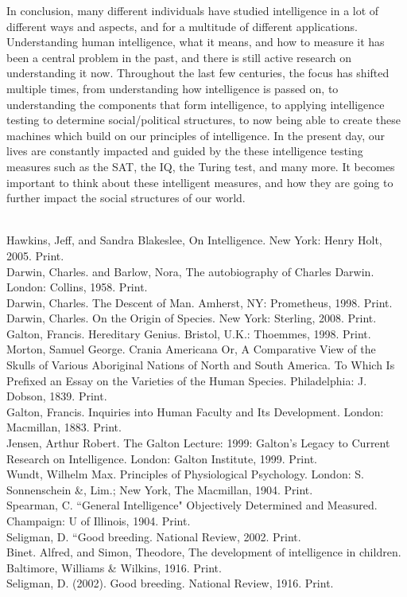 \documentclass[12pt, oneside]{article}
\begin{document}
\par In conclusion, many different individuals have studied intelligence in a lot of different ways and aspects, and for a multitude of different applications. Understanding human intelligence, what it means, and how to measure it has been a central problem in the past, and there is still active research on understanding it now. Throughout the last few centuries, the focus has shifted multiple times, from understanding how intelligence is passed on, to understanding the components that form intelligence, to applying intelligence testing to determine social/political structures, to now being able to create these machines which build on our principles of intelligence. In the present day, our lives are constantly impacted and guided by the these intelligence testing measures such as the SAT, the IQ, the Turing test, and many more. It becomes important to think about these intelligent measures, and how they are going to further impact the social structures of our world.

\noindent

\begin{workscited}
\bibent \\
\bibent Hawkins, Jeff, and Sandra Blakeslee, On Intelligence. New York: Henry Holt, 2005. Print. \\
\bibent Darwin, Charles. and Barlow, Nora, The autobiography of Charles Darwin. London: Collins, 1958. Print. \\
\bibent Darwin, Charles. The Descent of Man. Amherst, NY: Prometheus, 1998. Print. \\
\bibent Darwin, Charles. On the Origin of Species. New York: Sterling, 2008. Print. \\
\bibent Galton, Francis. Hereditary Genius. Bristol, U.K.: Thoemmes, 1998. Print. \\
\bibent Morton, Samuel George. Crania Americana Or, A Comparative View of the Skulls of Various Aboriginal Nations of North and South America. To Which Is Prefixed an Essay on the Varieties of the Human Species. Philadelphia: J. Dobson, 1839. Print.\\
\bibent Galton, Francis. Inquiries into Human Faculty and Its Development. London: Macmillan, 1883. Print.\\
\bibent Jensen, Arthur Robert. The Galton Lecture: 1999: Galton's Legacy to Current Research on Intelligence. London: Galton Institute, 1999. Print.\\
\bibent Wundt, Wilhelm Max. Principles of Physiological Psychology. London: S. Sonnenschein \&, Lim.; New York, The Macmillan, 1904. Print.\\
\bibent Spearman, C. ``General Intelligence" Objectively Determined and Measured. Champaign: U of Illinois, 1904. Print. \\
\bibent Seligman, D.  ``Good breeding. National Review, 2002. Print.\\
\bibent Binet. Alfred, and Simon, Theodore, The development of intelligence in children. Baltimore, Williams \& Wilkins, 1916. Print. \\
\bibent Seligman, D. (2002). Good breeding. National Review, 1916. Print. \\
\end{workscited}
\end{document}
